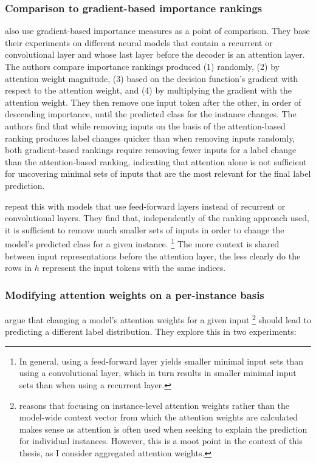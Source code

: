 \subsubsection{Comparison to gradient-based importance rankings}

\citet{serrano2019attention} also use gradient-based importance measures as a point of comparison.
They base their experiments on different neural models that contain a recurrent or convolutional layer and whose last layer before the decoder is an attention layer.
The authors compare importance rankings produced (1) randomly, (2) by attention weight magnitude, (3) based on the decision function's gradient with respect to the attention weight, and (4) by multiplying the gradient with the attention weight.
They then remove one input token after the other, in order of descending importance, until the predicted class for the instance changes.
The authors find that while removing inputs on the basis of the attention-based ranking produces label changes quicker than when removing inputs randomly, both gradient-based rankings require removing fewer inputs for a label change than the attention-based ranking, indicating that attention alone is not sufficient for uncovering minimal sets of inputs that are the most relevant for the final label prediction.

\citeauthor{serrano2019attention} repeat this with models that use feed-forward layers instead of recurrent or convolutional layers.
They find that, independently of the ranking approach used, it is sufficient to remove much smaller sets of inputs in order to change the model's predicted class for a given instance.%
\footnote{In general, using a feed-forward layer yields smaller minimal input sets than using a convolutional layer, which in turn results in smaller minimal input sets than when using a recurrent layer.}
The more context is shared between input representations before the attention layer, the less clearly do the rows in $h$ represent the input tokens with the same indices.

\subsubsection{Modifying attention weights on a per-instance basis}

\citet{jain2019attentionNotExplanation} argue that changing a model's attention weights for a given input%
\footnote{\citet{wallace2019thoughts} reasons that focusing on instance-level attention weights rather than the model-wide context vector from which the attention weights are calculated makes sense as attention is often used when seeking to explain the prediction for individual instances.
However, this is a moot point in the context of this thesis, as I consider aggregated attention weights.}
should lead to predicting a different label distribution.
They explore this in two experiments:

